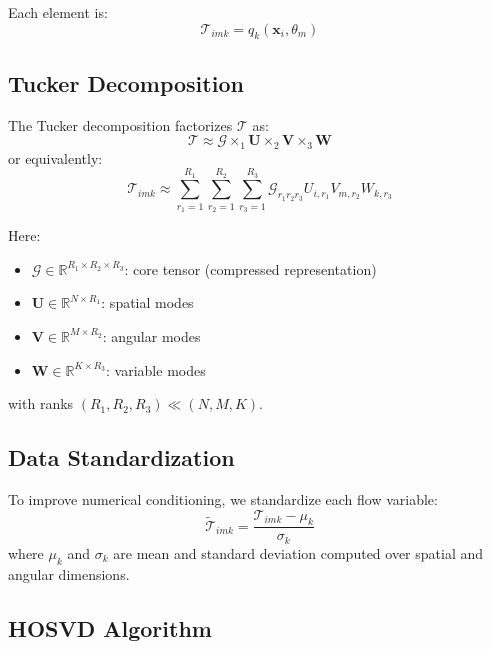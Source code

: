 \documentclass[conference]{IEEEtran}
\begin{document}
Each element is:
\begin{equation}
\mathcal{T}_{imk} = q_k(\mathbf{x}_i, \theta_m)
\end{equation}

\subsection{Tucker Decomposition}

The Tucker decomposition factorizes $\mathcal{T}$ as:
\begin{equation}
\mathcal{T} \approx \mathcal{G} \times_1 \mathbf{U} \times_2 \mathbf{V} \times_3 \mathbf{W}
\end{equation}
or equivalently:
\begin{equation}
\mathcal{T}_{imk} \approx \sum_{r_1=1}^{R_1} \sum_{r_2=1}^{R_2} \sum_{r_3=1}^{R_3} \mathcal{G}_{r_1 r_2 r_3} U_{i,r_1} V_{m,r_2} W_{k,r_3}
\end{equation}

Here:
\begin{itemize}
    \item $\mathcal{G} \in \mathbb{R}^{R_1 \times R_2 \times R_3}$: core tensor (compressed representation)
    \item $\mathbf{U} \in \mathbb{R}^{N \times R_1}$: spatial modes
    \item $\mathbf{V} \in \mathbb{R}^{M \times R_2}$: angular modes
    \item $\mathbf{W} \in \mathbb{R}^{K \times R_3}$: variable modes
\end{itemize}

with ranks $(R_1, R_2, R_3) \ll (N, M, K)$.

\subsection{Data Standardization}

To improve numerical conditioning, we standardize each flow variable:
\begin{equation}
\tilde{\mathcal{T}}_{imk} = \frac{\mathcal{T}_{imk} - \mu_k}{\sigma_k}
\end{equation}
where $\mu_k$ and $\sigma_k$ are mean and standard deviation computed over spatial and angular dimensions.

\subsection{HOSVD Algorithm}
\end{document}
